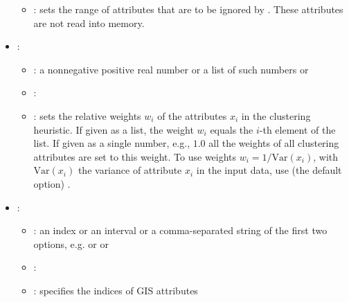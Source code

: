 \begin{itemize}
\begin{itemize}
                \item \optionDescrption{}:  sets the range of attributes that are to be ignored by \clus. These attributes are not read into memory.
           \end{itemize}
    \item {}:
           \begin{itemize}
                \item \optionPossibleValues{}: a nonnegative positive real number or a list of such numbers or 
                \item \optionDefaultValue{}: 
                \item \optionDescrption{}: sets the relative weights $w_i$ of the attributes $x_i$ in the clustering heuristic. If given as a list, the weight $w_i$ equals the $i$-th element of the list. If given as a single number, e.g., $1.0$
                all the weights of all clustering attributes are set to this weight. To use weights $w_i = 1/\mathrm{Var}(x_i)$, with $\mathrm{Var}(x_i)$ the variance of attribute $x_i$ in the input data, use (the default option) .
           \end{itemize}
    \item {}:
           \begin{itemize}
                \item \optionPossibleValues{}: an index or an interval or a comma-separated string of the first two options, e.g.  or  or 
                \item \optionDefaultValue{}: 
                \item \optionDescrption{}: specifies the indices of GIS attributes
           \end{itemize}
\end{itemize}
